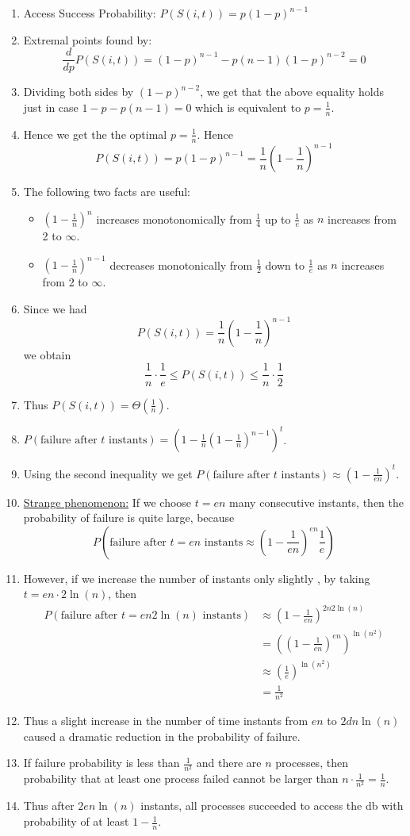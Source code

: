 \documentclass[12pt, letterpaper]{article}
\begin{document}
\begin{enumerate}
    \item Access Success Probability: $P(S(i, t)) = p(1-p)^{n - 1}$
    \item Extremal points found by: \[\frac{d}{dp}P(S(i, t)) = (1 - p)^{n - 1} - p(n - 1)(1 - p)^{n - 2} = 0\]
    \item Dividing both sides by $(1-p)^{n-2}$, we get that the above equality holds just in case $1-p-p(n-1) = 0$ which is equivalent to $p = \frac{1}{n}$.
    \item Hence we get the the optimal $p = \frac{1}{n}$. Hence \[P(S(i, t)) = p(1-p)^{n - 1} = \frac{1}{n}(1 - \frac{1}{n})^{n - 1}\]
    \item The following two facts are useful: \begin{itemize}
        \item $(1-\frac{1}{n})^n$ increases monotonomically from $\frac{1}{4}$ up to $\frac{1}{e}$ as $n$ increases from 2 to $\infty$.
        \item $(1-\frac{1}{n})^{n - 1}$ decreases monotonically from $\frac{1}{2}$ down to $\frac{1}{e}$ as $n$ increases from 2 to $\infty$.
    \end{itemize}
    \item Since we had \[P(S(i, t)) = \frac{1}{n}(1 - \frac{1}{n})^{n - 1}\] we obtain \[\frac{1}{n}\cdot\frac{1}{e}\leq P(S(i, t))\leq \frac{1}{n}\cdot\frac{1}{2}\]
    \item Thus $P(S(i, t)) = \Theta(\frac{1}{n})$.
    \item $P(\text{failure after $t$ instants}) = (1 - \frac{1}{n}(1 - \frac{1}{n})^{n - 1})^t$.
    \item Using the second inequality we get $P(\text{failure after $t$ instants}) \approx (1 - \frac{1}{en})^t$.
    \item \underline{Strange phenomenon:} If we choose $t = en$ many consecutive instants, then the probability of failure is quite large, because \[P(\text{failure after $t = en$ instants}\approx (1 - \frac{1}{en})^{en}\frac{1}{e})\]
    \item However, if we increase the number of instants only slightly , by taking $t = en\cdot 2\ln(n)$, then \begin{align*}
        P(\text{failure after $t = en2\ln(n)$ instants}) &\approx (1 - \frac{1}{en})^{2n2\ln(n)}\\
        &= ((1-\frac{1}{en})^{en})^{\ln(n^2)}\\
        &\approx (\frac{1}{e})^{\ln(n^2)}\\
        &=\frac{1}{n^2}
    \end{align*}
    \item Thus a slight increase in the number of time instants from $en$ to $2dn\ln(n)$ caused a dramatic reduction in the probability of failure.
    \item If failure probability is less than $\frac{1}{n^2}$ and there are $n$ processes, then probability that at least one process failed cannot be larger than $n \cdot \frac{1}{n^2} = \frac{1}{n}$.
    \item Thus after $2en\ln(n)$ instants, all processes succeeded to access the db with probability of at least $1-\frac{1}{n}$.
\end{enumerate}
\end{document}
